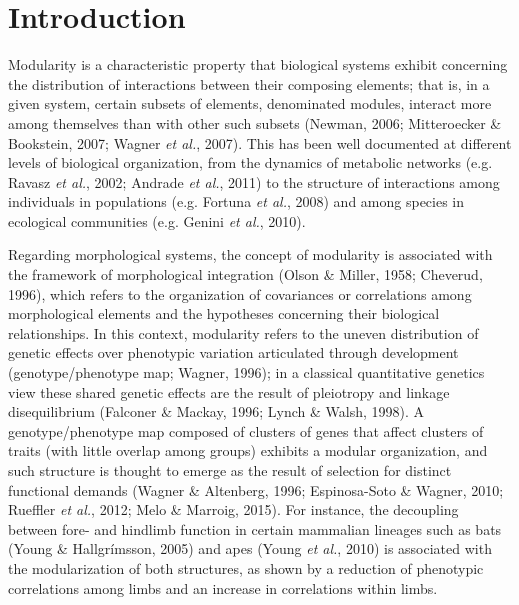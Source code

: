 \documentclass[12pt,]{article}
\begin{document}
\section{Introduction}\label{introduction}

Modularity is a characteristic property that biological systems exhibit
concerning the distribution of interactions between their composing
elements; that is, in a given system, certain subsets of elements,
denominated modules, interact more among themselves than with other such
subsets (Newman, 2006; Mitteroecker \& Bookstein, 2007; Wagner \emph{et
al.}, 2007). This has been well documented at different levels of
biological organization, from the dynamics of metabolic networks (e.g.
Ravasz \emph{et al.}, 2002; Andrade \emph{et al.}, 2011) to the
structure of interactions among individuals in populations (e.g. Fortuna
\emph{et al.}, 2008) and among species in ecological communities (e.g.
Genini \emph{et al.}, 2010).

Regarding morphological systems, the concept of modularity is associated
with the framework of morphological integration (Olson \& Miller, 1958;
Cheverud, 1996), which refers to the organization of covariances or
correlations among morphological elements and the hypotheses concerning
their biological relationships. In this context, modularity refers to
the uneven distribution of genetic effects over phenotypic variation
articulated through development (genotype/phenotype map; Wagner, 1996);
in a classical quantitative genetics view these shared genetic effects
are the result of pleiotropy and linkage disequilibrium (Falconer \&
Mackay, 1996; Lynch \& Walsh, 1998). A genotype/phenotype map composed
of clusters of genes that affect clusters of traits (with little overlap
among groups) exhibits a modular organization, and such structure is
thought to emerge as the result of selection for distinct functional
demands (Wagner \& Altenberg, 1996; Espinosa-Soto \& Wagner, 2010;
Rueffler \emph{et al.}, 2012; Melo \& Marroig, 2015). For instance, the
decoupling between fore- and hindlimb function in certain mammalian
lineages such as bats (Young \& Hallgrímsson, 2005) and apes (Young
\emph{et al.}, 2010) is associated with the modularization of both
structures, as shown by a reduction of phenotypic correlations among
limbs and an increase in correlations within limbs.
\end{document}

